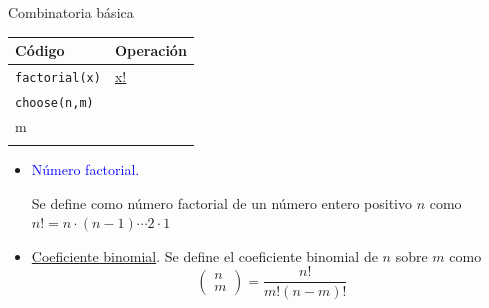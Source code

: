 \documentclass[
  ignorenonframetext,
  aspectratio=169]{beamer}
\newcommand\blue[1]{\textcolor{blue}{#1}}
\begin{document}
\begin{frame}[fragile]{Combinatoria básica}
\label{combinatoria-buxe1sica}
\begin{longtable}[]{@{}ll@{}}
\toprule\noalign{}
Código & Operación \\
\midrule\noalign{}
\endhead
\texttt{factorial(x)} &
\href{https://es.wikipedia.org/wiki/Factorial}{x!} \\
\texttt{choose(n,m)} & \(\begin{pmatrix}n\\ m\end{pmatrix}\) \\
\bottomrule\noalign{}
\end{longtable}

\vspace{0.2cm}

\begin{itemize}
\item
  \blue{Número factorial.}

  Se define como número factorial de un número entero positivo \(n\)
  como \(n!=n\cdot(n-1)\cdots 2\cdot 1\)
\item
  \href{https://es.wikipedia.org/wiki/Coeficiente_binomial}{Coeficiente
  binomial}. Se define el coeficiente binomial de \(n\) sobre \(m\) como
  \[\begin{pmatrix}n\\ m\end{pmatrix}=\frac{n!}{m!(n-m)!}\]
\end{itemize}
\end{frame}
\end{document}
